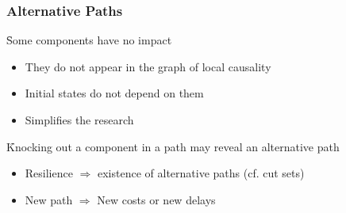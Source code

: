 
\begin{frame}
\frametitle{Alternative Paths}


\pause
\bigskip
\f Some components have no impact
\begin{itemize}
  \item They do not appear in the graph of local causality
  \item Initial states do not depend on them
  \item Simplifies the research
\end{itemize}

\pause
\bigskip
\f Knocking out a component in a path may reveal an alternative path
\begin{itemize}
  \item Resilience $\Rightarrow$ existence of alternative paths (cf. cut sets)
  \item New path $\Rightarrow$ New costs or new delays
\end{itemize}

\end{frame}

